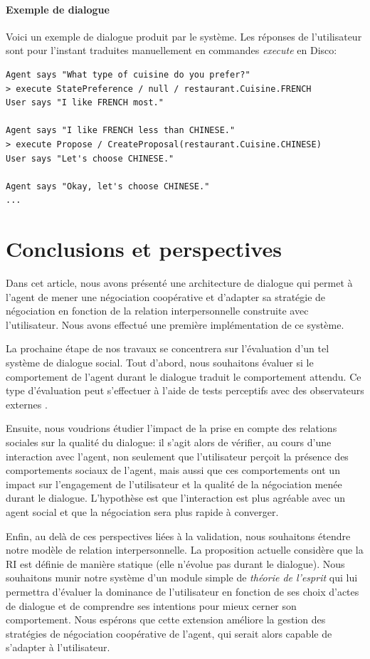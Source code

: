 \documentclass [french]{sig-alternate-05-2015}
\begin{document}
\paragraph{Exemple de dialogue}
Voici un exemple de dialogue produit par le système. Les réponses de l'utilisateur sont pour l'instant traduites manuellement en commandes \emph{execute} en Disco:
{\small
\begin{verbatim}
Agent says "What type of cuisine do you prefer?"
> execute StatePreference / null / restaurant.Cuisine.FRENCH
User says "I like FRENCH most."

Agent says "I like FRENCH less than CHINESE."
> execute Propose / CreateProposal(restaurant.Cuisine.CHINESE)
User says "Let's choose CHINESE."

Agent says "Okay, let's choose CHINESE."
...
\end{verbatim}
}

\section{Conclusions et perspectives}
\label{conc}
Dans cet article, nous avons présenté une architecture de dialogue qui permet à l'agent de mener une négociation coopérative et d'adapter sa stratégie de négociation en fonction de la relation interpersonnelle construite avec l'utilisateur. Nous avons effectué une première implémentation de ce système. 

\par La prochaine étape de nos travaux se concentrera sur l'évaluation d'un tel système de dialogue social. Tout d'abord, nous souhaitons évaluer si le comportement de l'agent durant le dialogue traduit le comportement attendu. Ce type d'évaluation peut s'effectuer à l'aide de tests perceptifs avec des observateurs externes \cite{bickmore2012empirical}.

\par Ensuite, nous voudrions étudier l'impact de la prise en compte des relations sociales sur la qualité du dialogue: il s'agit alors de vérifier, au cours d'une interaction avec l'agent, non seulement que l'utilisateur perçoit la présence des comportements sociaux de l'agent, mais aussi que ces comportements ont un impact sur l'engagement de l'utilisateur et la qualité de la négociation menée durant le dialogue. L'hypothèse est que l'interaction est plus agréable avec un agent social et que la négociation sera plus rapide à converger.

\par Enfin, au delà de ces perspectives liées à la validation, nous souhaitons étendre notre modèle de relation interpersonnelle. La proposition actuelle considère que la RI est définie de manière statique (elle n'évolue pas durant le dialogue). Nous souhaitons munir notre système d'un module simple de \emph{théorie de l'esprit} qui lui permettra d'évaluer la dominance de l'utilisateur en fonction de ses choix d'actes de dialogue et de comprendre ses intentions pour mieux cerner son comportement. Nous espérons que cette extension améliore la gestion des stratégies de négociation coopérative de l'agent, qui serait alors capable de s'adapter à l'utilisateur.
 
\vskip 5pt


\end{document}
